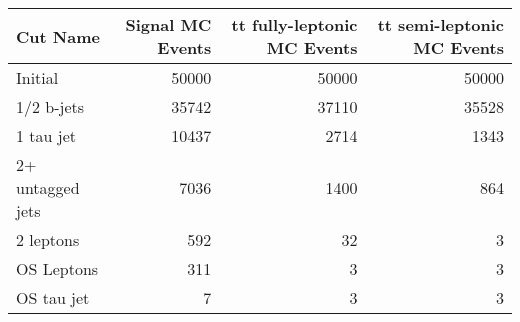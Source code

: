 \begin{tabular}{lrrr}
\toprule
         Cut Name &  Signal MC Events &  tt fully-leptonic MC Events &  tt semi-leptonic MC Events \\
\midrule
          Initial &             50000 &                        50000 &                       50000 \\
       1/2 b-jets &             35742 &                        37110 &                       35528 \\
        1 tau jet &             10437 &                         2714 &                        1343 \\
 2+ untagged jets &              7036 &                         1400 &                         864 \\
        2 leptons &               592 &                           32 &                           3 \\
       OS Leptons &               311 &                            3 &                           3 \\
       OS tau jet &                 7 &                            3 &                           3 \\
\bottomrule
\end{tabular}
